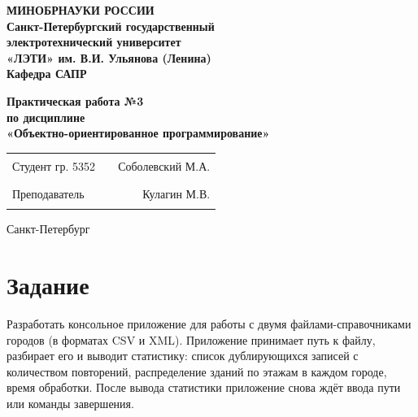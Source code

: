 \documentclass[12pt]{extarticle}
\begin{document}
\begin{center}
  \textbf{МИНОБРНАУКИ РОССИИ} \\
  \textbf{Санкт-Петербургский государственный} \\
  \textbf{электротехнический университет} \\
  \textbf{«ЛЭТИ» им. В.И. Ульянова (Ленина)} \\
  \textbf{Кафедра САПР} \\
\end{center}

\vspace{0.25\textheight}

\begin{center}
\textbf{Практическая работа №3} \\
\textbf{по дисциплине} \\
\textbf{«Объектно-ориентированное программирование»} \\
\end{center}

\vspace*{\fill}

\begin{center}
\begin{tabularx}{\textwidth}{ l X r }
 Студент гр. 5352 & \rule{8cm}{0.2mm} & Соболевский М.А. \\
 Преподаватель & \rule{8cm}{0.2mm} & Кулагин М.В. \\
\end{tabularx}
\end{center}

\vspace{3em}

\begin{center}
Санкт-Петербург\\
\the\year
\end{center}

\thispagestyle{empty}

\pagebreak

\section{Задание}

Разработать консольное приложение для работы с двумя
файлами-справочниками городов (в форматах CSV и XML). Приложение
принимает путь к файлу, разбирает его и выводит статистику:
список дублирующихся записей с количеством повторений,
распределение зданий по этажам в каждом городе, время обработки.
После вывода статистики приложение снова ждёт ввода пути или
команды завершения.
\end{document}
